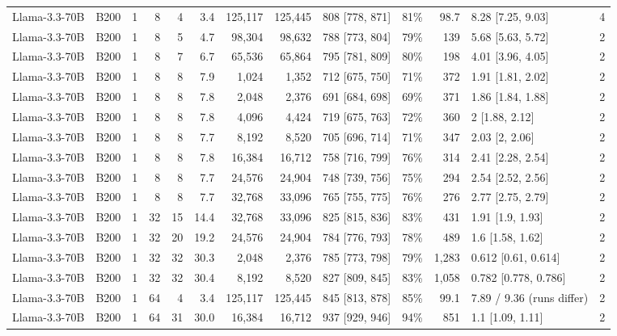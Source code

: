 \begin{landscape}
\begin{longtable}{llrrrrrrlrrlr}
Llama-3.3-70B & B200 & 1 & 8 & 4 & 3.4 & 125,117 & 125,445 & 808 {[}778, 871{]} & 81\% & 98.7 & 8.28 {[}7.25, 9.03{]} & 4 \\
Llama-3.3-70B & B200 & 1 & 8 & 5 & 4.7 & 98,304 & 98,632 & 788 {[}773, 804{]} & 79\% & 139 & 5.68 {[}5.63, 5.72{]} & 2 \\
Llama-3.3-70B & B200 & 1 & 8 & 7 & 6.7 & 65,536 & 65,864 & 795 {[}781, 809{]} & 80\% & 198 & 4.01 {[}3.96, 4.05{]} & 2 \\
Llama-3.3-70B & B200 & 1 & 8 & 8 & 7.9 & 1,024 & 1,352 & 712 {[}675, 750{]} & 71\% & 372 & 1.91 {[}1.81, 2.02{]} & 2 \\
Llama-3.3-70B & B200 & 1 & 8 & 8 & 7.8 & 2,048 & 2,376 & 691 {[}684, 698{]} & 69\% & 371 & 1.86 {[}1.84, 1.88{]} & 2 \\
Llama-3.3-70B & B200 & 1 & 8 & 8 & 7.8 & 4,096 & 4,424 & 719 {[}675, 763{]} & 72\% & 360 & 2 {[}1.88, 2.12{]} & 2 \\
Llama-3.3-70B & B200 & 1 & 8 & 8 & 7.7 & 8,192 & 8,520 & 705 {[}696, 714{]} & 71\% & 347 & 2.03 {[}2, 2.06{]} & 2 \\
Llama-3.3-70B & B200 & 1 & 8 & 8 & 7.8 & 16,384 & 16,712 & 758 {[}716, 799{]} & 76\% & 314 & 2.41 {[}2.28, 2.54{]} & 2 \\
Llama-3.3-70B & B200 & 1 & 8 & 8 & 7.7 & 24,576 & 24,904 & 748 {[}739, 756{]} & 75\% & 294 & 2.54 {[}2.52, 2.56{]} & 2 \\
Llama-3.3-70B & B200 & 1 & 8 & 8 & 7.7 & 32,768 & 33,096 & 765 {[}755, 775{]} & 76\% & 276 & 2.77 {[}2.75, 2.79{]} & 2 \\
Llama-3.3-70B & B200 & 1 & 32 & 15 & 14.4 & 32,768 & 33,096 & 825 {[}815, 836{]} & 83\% & 431 & 1.91 {[}1.9, 1.93{]} & 2 \\
Llama-3.3-70B & B200 & 1 & 32 & 20 & 19.2 & 24,576 & 24,904 & 784 {[}776, 793{]} & 78\% & 489 & 1.6 {[}1.58, 1.62{]} & 2 \\
Llama-3.3-70B & B200 & 1 & 32 & 32 & 30.3 & 2,048 & 2,376 & 785 {[}773, 798{]} & 79\% & 1,283 & 0.612 {[}0.61, 0.614{]} & 2 \\
Llama-3.3-70B & B200 & 1 & 32 & 32 & 30.4 & 8,192 & 8,520 & 827 {[}809, 845{]} & 83\% & 1,058 & 0.782 {[}0.778, 0.786{]} & 2 \\
Llama-3.3-70B & B200 & 1 & 64 & 4 & 3.4 & 125,117 & 125,445 & 845 {[}813, 878{]} & 85\% & 99.1 & 7.89 / 9.36 (runs differ) & 2 \\
Llama-3.3-70B & B200 & 1 & 64 & 31 & 30.0 & 16,384 & 16,712 & 937 {[}929, 946{]} & 94\% & 851 & 1.1 {[}1.09, 1.11{]} & 2 \\

\end{longtable}
\end{landscape}
